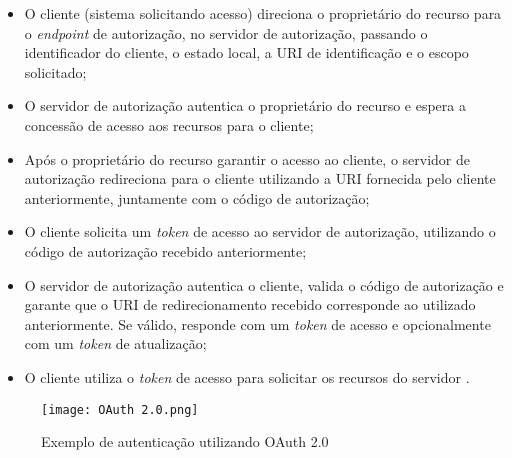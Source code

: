 \begin{itemize}
\item O cliente (sistema solicitando acesso) direciona o proprietário do recurso para o \emph{endpoint} de autorização, no servidor
de autorização, passando o identificador do cliente, o estado local, a URI de identificação e o 
escopo solicitado;
\item O servidor de autorização autentica o proprietário do recurso e espera a concessão de acesso 
aos recursos para o cliente;
\item Após o proprietário do recurso garantir o acesso ao cliente, o servidor de autorização 
redireciona para o cliente utilizando a URI fornecida pelo cliente anteriormente, juntamente com o 
código de autorização;
\item O cliente solicita um \emph{token} de acesso ao servidor de autorização, utilizando o código
de autorização recebido anteriormente;
\item O servidor de autorização autentica o cliente, valida o código de autorização e garante que o 
URI de redirecionamento recebido corresponde ao utilizado anteriormente. Se válido, responde com um 
\emph{token} de acesso e opcionalmente com um \emph{token} de atualização;
\item O cliente utiliza o \emph{token} de acesso para solicitar os recursos do servidor \cite{RFC6749}.
\end{itemize}

\begin{figure}[ht]
    \centering
    \texttt{[image: OAuth 2.0.png]}
    \caption{Exemplo de autenticação utilizando OAuth 2.0}
    \label{fig:OAuth2}
\end{figure}